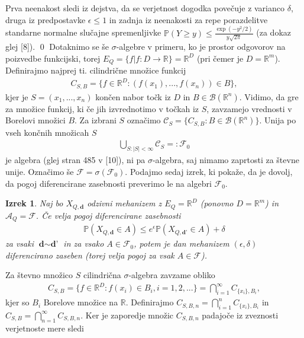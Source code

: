 \documentclass[12pt,a4paper]{amsart}
\theoremstyle{definition} %
\theoremstyle{plain} %
\newtheorem{izrek}[definicija]{Izrek}
\begin{document}
Prva neenakost sledi iz dejstva, da se verjetnost dogodka povečuje z varianco $\delta$, druga iz predpostavke $\epsilon \leq 1$ in zadnja iz neenakosti za repe porazdelitve standarne normalne slučajne spremenljivke $\mathbb{P}(Y \geq y) \leq \frac{\exp(-y^2 / 2)}{y \sqrt{2\pi}}$ (za dokaz glej [8]).
\qed
\newline
\newline
Dotaknimo se še $\sigma$-algebre v primeru, ko je prostor odgovorov na poizvedbe funkcijski, torej $E_Q = \{f | f : D \rightarrow \mathbb{R}\} = \mathbb{R}^D$ (pri čemer je $D=\mathbb{R}^m$). Definirajmo najprej ti. cilindrične množice funkcij 
\begin{gather*}
C_{S,B} = \{ f \in \mathbb{R}^D : (f(x_1), ..., f(x_n)) \in B \},
\end{gather*}
kjer je $S = (x_1,...,x_n)$ končen nabor točk iz $D$ in $B \in \mathcal{B}(\mathbb{R}^n)$. Vidimo, da gre za množice funkcij, ki če jih izvrednotimo v točkah iz $S$, zavzamejo vrednosti v Borelovi množici $B$. Za izbrani $S$ označimo $\mathcal{C}_S = \{ C_{S,B} : B \in \mathcal{B}(\mathbb{R}^n) \}$. Unija po vseh končnih množicah $S$
\begin{gather*}
\bigcup_{S : |S| < \infty} \mathcal{C}_S =: \mathcal{F}_0
\end{gather*}
je algebra (glej stran 485 v [10]), ni pa $\sigma$-algebra, saj nimamo zaprtosti za števne unije. Označimo še $\mathcal{F} = \sigma(\mathcal{F}_0)$. Podajmo sedaj izrek, ki pokaže, da je dovolj, da pogoj diferencirane zasebnosti preverimo le na algebri $\mathcal{F}_0$. 
\begin{izrek}
Naj bo $X_{Q,\textbf{d}}$ odzivni mehanizem z $E_Q = \mathbb{R}^D$ (ponovno $D = \mathbb{R}^m$) in $\mathcal{A}_Q = \mathcal{F}$. Če velja pogoj diferencirane zasebnosti 
\begin{gather*}
\mathbb{P}(X_{Q,\textbf{d}} \in A) \leq e^\epsilon \mathbb{P}(X_{Q,\textbf{d'}} \in A) + \delta
\end{gather*}
za vsaki $\textbf{d} \sim \textbf{d'}$ in za vsako $A \in \mathcal{F}_0$, potem je dan mehanizem $(\epsilon, \delta)$ diferencirano zaseben (torej velja pogoj za vsak $A \in \mathcal{F}$).
\end{izrek}
\proof Za števno množico $S$ cilindrična $\sigma$-algebra zavzame obliko
\begin{gather*}
C_{S,B} = \{ f \in \mathbb{R}^D : f(x_i) \in B_i, i = 1,2,... \} = \bigcap_{i=1}^{\infty}C_{\{x_i\},B_i},
\end{gather*}
kjer so $B_i$ Borelove množice na $\mathbb{R}$. Definirajmo $C_{S,B,n} = \bigcap_{i=1}^{n}C_{\{x_i\},B_i}$ in $C_{S,B} = \bigcap_{n=1}^{\infty}C_{S,B,n}$. Ker je zaporedje množic $C_{S,B,n}$ padajoče iz zveznosti verjetnoste mere sledi
\end{document}
